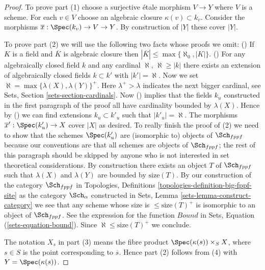 \begin{proof}
To prove part (1) choose a surjective \'etale morphism $V \to Y$ where
$V$ is a scheme. For each $v \in V$ choose an algebraic closure
$\kappa(v) \subset k_v$. Consider the morphisms
$\overline{x} : \Spec(k_v) \to V \to Y$.
By construction of $|Y|$ these cover $|Y|$.

\medskip\noindent
To prove part (2) we will use the following two facts whose proofs we omit:
() If $K$ is a field and $\overline{K}$ is algebraic closure then
$|\overline{K}| \leq \max\{\aleph_0, |K|\}$.
() For any algebraically closed field $k$ and any cardinal
$\aleph$, $\aleph \geq |k|$ there exists an extension of algebraically
closed fields $k \subset k'$ with $|k'| = \aleph$.
Now we set $\aleph = \max\{\lambda(X), \lambda(Y)\}^+$.
Here $\lambda^+ > \lambda$ indicates the next bigger cardinal, see
Sets, Section \ref{sets-section-cardinals}.
Now ()
implies that the fields $k_u$ constructed in the first paragraph
of the proof all have cardinality bounded by $\lambda(X)$. Hence
by () we can find extensions $k_u \subset k'_u$ such that
$|k'_u| = \aleph$. The morphisms
$\overline{x}' : \Spec(k'_u) \to X$ cover $|X|$ as desired.
To really finish the proof of (2) we need to show that the schemes
$\Spec(k'_u)$ are (isomorphic to) objects of $\Sch_{fppf}$
because our conventions are that all schemes are objects of
$\Sch_{fppf}$; the rest of this paragraph should be skipped by
anyone who is not interested in set theoretical considerations. By
construction there exists an object $T$ of $\Sch_{fppf}$ such that
$\lambda(X)$ and $\lambda(Y)$ are bounded by $\text{size}(T)$.
By our construction of the category $\Sch_{fppf}$ in
Topologies, Definitions \ref{topologies-definition-big-fppf-site}
as the category $\Sch_\alpha$ constructed in
Sets, Lemma \ref{sets-lemma-construct-category}
we see that any scheme whose size is $\leq \text{size}(T)^+$
is isomorphic to an object of $\Sch_{fppf}$. See
the expression for the function $Bound$ in
Sets, Equation (\ref{sets-equation-bound}).
Since $\aleph \leq \text{size}(T)^+$ we conclude.

\medskip\noindent
The notation $X_s$ in part (3) means
the fibre product $\Spec(\kappa(s)) \times_S X$, where $s \in S$
is the point corresponding to $\overline{s}$. Hence part (2) follows
from (4) with $Y = \Spec(\kappa(s))$.


\end{proof}
